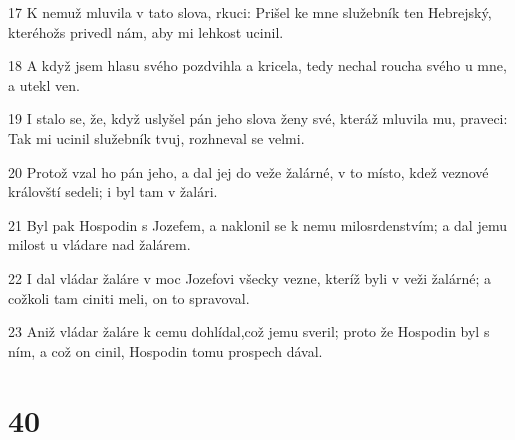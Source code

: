 \par 17 K nemuž mluvila v tato slova, rkuci: Prišel ke mne služebník ten Hebrejský, kteréhožs privedl nám, aby mi lehkost ucinil.
\par 18 A když jsem hlasu svého pozdvihla a kricela, tedy nechal roucha svého u mne, a utekl ven.
\par 19 I stalo se, že, když uslyšel pán jeho slova ženy své, kteráž mluvila mu, praveci: Tak mi ucinil služebník tvuj, rozhneval se velmi.
\par 20 Protož vzal ho pán jeho, a dal jej do veže žalárné, v to místo, kdež veznové královští sedeli; i byl tam v žalári.
\par 21 Byl pak Hospodin s Jozefem, a naklonil se k nemu milosrdenstvím; a dal jemu milost u vládare nad žalárem.
\par 22 I dal vládar žaláre v moc Jozefovi všecky vezne, kteríž byli v veži žalárné; a cožkoli tam ciniti meli, on to spravoval.
\par 23 Aniž vládar žaláre k cemu dohlídal,což jemu sveril; proto že Hospodin byl s ním, a což on cinil, Hospodin tomu prospech dával.

\chapter{40}

